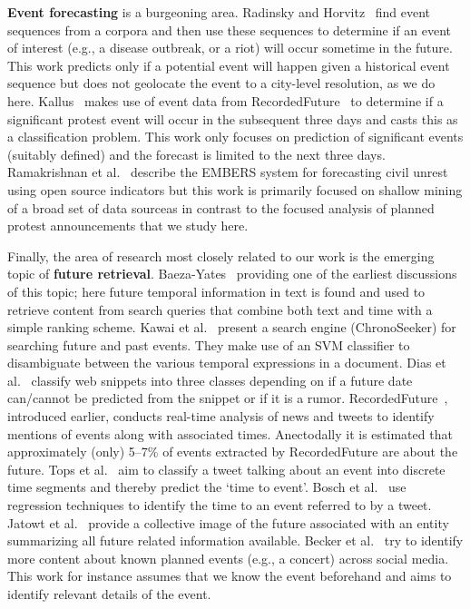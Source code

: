 {\bf Event forecasting} is a burgeoning area. 
Radinsky and Horvitz~\cite{Radinsky:2013:MWP} find event sequences from a corpora and then use these sequences to determine if 
an event of interest (e.g., a disease outbreak, or a riot)
will occur sometime in the future. This work predicts only if a potential event will happen given a historical event sequence
but does not geolocate the event to a city-level resolution, as we do here.
Kallus~\cite{nathankallus} makes use of event data from 
RecordedFuture~\cite{recordedFuture} to determine if a  significant protest event will occur in 
the subsequent three days and casts this as a classification problem.
This work only focuses on prediction of significant events (suitably defined) and
the forecast is limited to the next three days. Ramakrishnan et al.~\cite{emberskdd} describe the EMBERS
system for forecasting civil unrest using open source indicators but this work is primarily focused on shallow mining of
a broad set of data sourceas in contrast to the focused analysis of planned protest announcements that we study here.

Finally, the area of research most closely related to our work is the emerging topic of
{\bf future retrieval}.
Baeza-Yates~\cite{baeza2005searching} providing one of the earliest discussions
of this topic; here future temporal information in text is found and used to retrieve content from search queries that 
combine both text and time with a simple ranking scheme. Kawai et al.~\cite{Kawai:2010:CSE} present a search engine (ChronoSeeker) for searching 
future and past events.
They make use of an SVM classifier to disambiguate between the various temporal expressions in a document.
Dias et al.~\cite{dias2011future} classify web snippets into three classes depending on if a future date can/cannot be predicted 
from the snippet or if it is a rumor.
RecordedFuture~\cite{recordedFuture}, introduced earlier, conducts
real-time analysis of news and tweets to identify mentions of events along with associated times. Anectodally it 
is estimated that approximately (only) 5--7\% of events extracted 
by RecordedFuture are about the future.
Tops et al.~\cite{tops2013predicting} aim to classify a tweet talking about an event into discrete time segments and thereby predict the 
`time to event'.
Bosch et al.~\cite{bosch2013estm} use regression techniques to identify the time to an event referred to by a tweet.
Jatowt et al.~\cite{Jatowt:2011:ECE} provide a collective image of the future associated with an entity summarizing all future related information available.
Becker et al.~\cite{Becker:2012:ICP} try to identify more content about known planned events (e.g., a concert) across social media. This work
for instance assumes that we know the event beforehand and aims to identify relevant details of the event.

